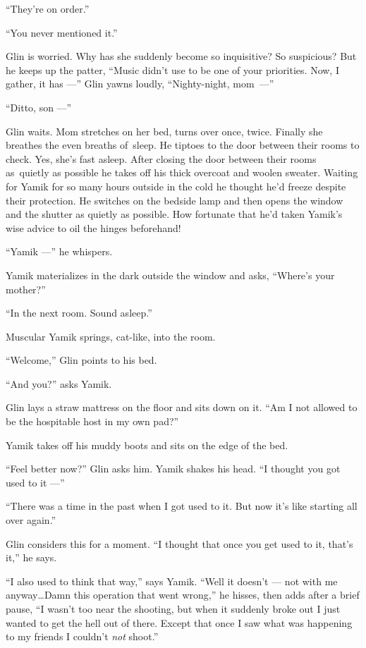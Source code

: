 \documentclass[twoside,11pt]{book}
\begin{document}
``They're on order.''

``You never mentioned it.''

Glin is worried. Why has she suddenly become so inquisitive? So suspicious? But he keeps up the patter,
``Music didn't use to be one of your priorities. Now, I gather, it has ---'' Glin yawns
loudly{,} ``Nighty-night, mom~---''

``Ditto, son ---''

Glin waits. Mom stretches on her bed, turns over once, twice. Finally she breathes the even breaths of~sleep. He
tiptoes to the door between their rooms to check. Yes, she's fast asleep. After closing the door between their rooms
as~quietly as possible he takes off his thick overcoat and woolen sweater. Waiting for Yamik for so many hours outside
in the cold he thought he'd freeze despite their protection. He switches on the bedside lamp and then opens the window
and the shutter as quietly as possible. How fortunate that he'd
taken Yamik's wise advice to oil the hinges beforehand!

 ``Yamik ---'' he whispers.

Yamik materializes in the dark outside the window and asks, ``Where's your mother?''

``In the next room. Sound asleep.''

Muscular Yamik springs, cat-like, into the room.

``Welcome,'' Glin points to his bed.

``And you?'' asks Yamik.

Glin lays a straw mattress on the floor and sits down on it. ``Am I not allowed to be the hospitable host
in my own pad?''

Yamik takes off his muddy boots and sits on the edge of the bed.

``Feel better now?'' Glin asks him. Yamik shakes his
head.{ }``I thought you got used to it ---''

``There was a time in the past when I got used to it. But now it's like starting all over
again.''

Glin considers this for a moment. ``I thought that once you get used to it, that's it,'' he
says.

``I also used to think that way,'' says Yamik. ``Well it doesn't --- not with me anyway{\ldots}Damn this
operation that went wrong,'' he hisses, then adds after a brief pause, ``I wasn't too near
the shooting, but when it suddenly{ }broke out I
just{ }wanted to get the hell out of there. Except that once I saw what was
happening to my friends I couldn't \textit{not} shoot.''
\end{document}
